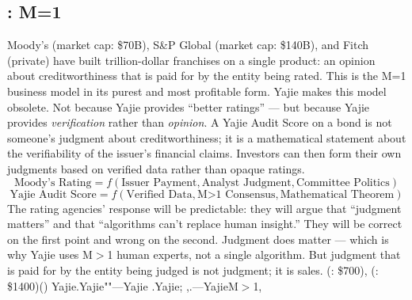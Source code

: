\documentclass[12pt,a4paper]{article}
\theoremstyle{remark}
\begin{document}
\subsection{: M=1}
Moody's (market cap: \$70B), S\&P Global (market cap: \$140B), and Fitch (private) have 
built trillion-dollar franchises on a single product: an opinion about creditworthiness 
that is paid for by the entity being rated. This is the M=1 business model in its purest 
and most profitable form.
Yajie makes this model obsolete. Not because Yajie provides ``better ratings'' --- but 
because Yajie provides \textit{verification} rather than \textit{opinion}. A Yajie Audit 
Score on a bond is not someone's judgment about creditworthiness; it is a mathematical 
statement about the verifiability of the issuer's financial claims. Investors can then 
form their own judgments based on verified data rather than opaque ratings.
\begin{equation}
 \text{Moody's Rating} = f(\text{Issuer Payment}, \text{Analyst Judgment}, \text{Committee Politics})
\end{equation}
\begin{equation}
 \text{Yajie Audit Score} = f(\text{Verified Data}, \text{M>1 Consensus}, \text{Mathematical Theorem})
\end{equation}
The rating agencies' response will be predictable: they will argue that ``judgment matters'' 
and that ``algorithms can't replace human insight.'' They will be correct on the first 
point and wrong on the second. Judgment does matter --- which is why Yajie uses M$>$1 human 
experts, not a single algorithm. But judgment that is paid for by the entity being judged 
is not judgment; it is sales.
\medskip
(: \$700), (: \$1400)()
Yajie.Yajie""---Yajie\textit{}
\textit{}.Yajie; 
,.---YajieM$>$1, 
\end{document}
